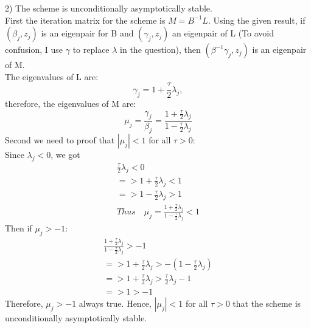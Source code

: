 \documentclass[11pt]{article}
\begin{document}
    2) The scheme is unconditionally asymptotically stable. \\


    First the iteration matrix for the scheme is $M = B^{-1}L$. Using the given result, if $(\beta_{j}, z_{j})$ is an eigenpair for B and $(\gamma_j, z_j)$ an eigenpair of L (To avoid confusion, I use $\gamma$ to replace $\lambda$ in the question), then $(\beta^{-1}\gamma_{j},z_j)$ is an eigenpair of M.\\
    The eigenvalues of L are:
    \[
        \gamma_j = 1 + \frac{\tau}{2}\lambda_j,
    \]
    therefore, the eigenvalues of M are:
    \[
        \mu_j = \frac{\gamma_j}{\beta_j} = \frac{1+\frac{\tau}{2}\lambda_j}{1-\frac{\tau}{2}\lambda_j}
    \]
    Second we need to proof that $|\mu_j| < 1$ for all $\tau > 0$:\\
    Since $\lambda_j < 0$, we got
    \[
        \begin{gathered}
            \frac{\tau}{2}\lambda_j < 0 \\
            => 1 + \frac{\tau}{2}\lambda_j < 1 \\
            => 1 - \frac{\tau}{2}\lambda_j > 1 \\
            Thus \quad \mu_j = \frac{1+\frac{\tau}{2}\lambda_j}{1-\frac{\tau}{2}\lambda_j} < 1
        \end{gathered}
    \]
    Then if $\mu_j > -1$:
    \[
        \begin{gathered}
            \frac{1+\frac{\tau}{2}\lambda_j}{1-\frac{\tau}{2}\lambda_j} > -1 \\
            => 1 + \frac{\tau}{2}\lambda_j > -(1 - \frac{\tau}{2}\lambda_j) \\
            => 1 + \frac{\tau}{2}\lambda_j > \frac{\tau}{2}\lambda_j-1 \\
            => 1 > -1
        \end{gathered}
    \]
    Therefore, $\mu_j > -1$ always true.
    Hence, $|\mu_j| < 1$ for all $\tau > 0$ that the scheme is unconditionally asymptotically stable.
\end{document}
